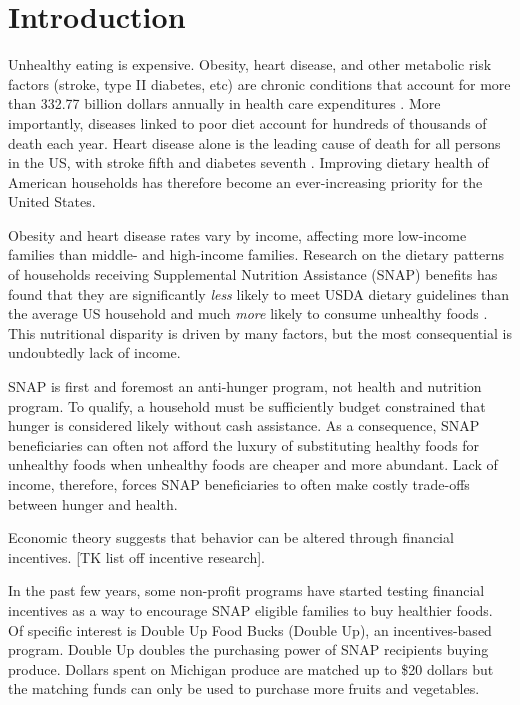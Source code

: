 \documentclass[11pt,letterpaperpaper,]{book}
\begin{document}
\section{Introduction}\label{introduction}

Unhealthy eating is expensive. Obesity, heart disease, and other
metabolic risk factors (stroke, type II diabetes, etc) are chronic
conditions that account for more than 332.77 billion dollars annually in
health care expenditures \citep{chatterjee_checkup_2014}. More
importantly, diseases linked to poor diet account for hundreds of
thousands of death each year. Heart disease alone is the leading cause
of death for all persons in the US, with stroke fifth and diabetes
seventh \citep{national_center_for_health_statistics_health_2015}.
Improving dietary health of American households has therefore become an
ever-increasing priority for the United States.

Obesity and heart disease rates vary by income, affecting more
low-income families than middle- and high-income families. Research on
the dietary patterns of households receiving Supplemental Nutrition
Assistance (SNAP) benefits has found that they are significantly
\emph{less} likely to meet USDA dietary guidelines than the average US
household and much \emph{more} likely to consume unhealthy foods
\citep{andreyeva_dietary_2015, nguyen_supplemental_2015, wolfson_fruit_2015}.
This nutritional disparity is driven by many factors, but the most
consequential is undoubtedly lack of income.

SNAP is first and foremost an anti-hunger program, not health and
nutrition program. To qualify, a household must be sufficiently budget
constrained that hunger is considered likely without cash assistance. As
a consequence, SNAP beneficiaries can often not afford the luxury of
substituting healthy foods for unhealthy foods when unhealthy foods are
cheaper and more abundant. Lack of income, therefore, forces SNAP
beneficiaries to often make costly trade-offs between hunger and health.

Economic theory suggests that behavior can be altered through financial
incentives. {[}TK list off incentive research{]}.

In the past few years, some non-profit programs have started testing
financial incentives as a way to encourage SNAP eligible families to buy
healthier foods. Of specific interest is Double Up Food Bucks (Double
Up), an incentives-based program. Double Up doubles the purchasing power
of SNAP recipients buying produce. Dollars spent on Michigan produce are
matched up to \$20 dollars but the matching funds can only be used to
purchase more fruits and vegetables.
\end{document}
